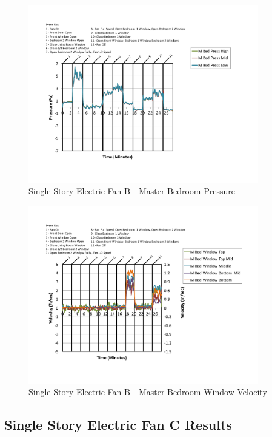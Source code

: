 \documentclass{article}
\begin{document}
\begin{appendices}
	\begin{figure}[H]
		\centering
		\includegraphics[height=3.05in,trim=0.67in 1.1in 0.67in 0.8in,clip=true]{0_Images/Results_Charts/ColdFlow/Single_Story/Electric/B/Master_Bedroom_Pressure.pdf}
		\caption{Single Story Electric Fan B - Master Bedroom Pressure}
	\end{figure}
 

	\begin{figure}[H]
		\centering
		\includegraphics[height=3.05in,trim=0.67in 1.1in 0.67in 0.8in,clip=true]{0_Images/Results_Charts/ColdFlow/Single_Story/Electric/B/Master_Bedroom_Window_Velocity.pdf}
		\caption{Single Story Electric Fan B - Master Bedroom Window Velocity}
	\end{figure}
 
	\clearpage

		\clearpage
\clearpage		\large
\subsection{Single Story Electric Fan C Results} \label{App:Single_StoryElectricFanCResults} 


\end{appendices}
\end{document}
